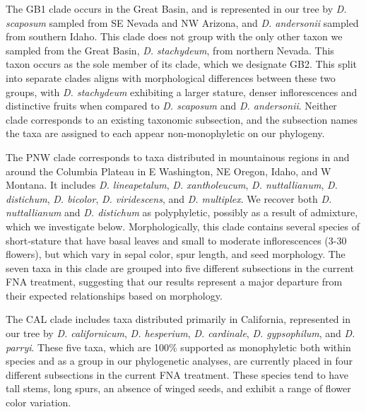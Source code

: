 \documentclass[11pt]{article}
\begin{document}
The GB1 clade occurs in the Great Basin, and is represented in our tree
by \emph{D. scaposum} sampled from SE Nevada and NW Arizona, and 
\emph{D. andersonii} sampled from southern Idaho.
This clade does not group with the only other taxon we sampled from the Great
Basin, \emph{D. stachydeum}, from northern Nevada. This taxon occurs as the
sole member of its clade, which we designate GB2. 
% 
This split into separate clades aligns with morphological differences between these
two groups, with \textit{D. stachydeum} exhibiting a larger stature, denser 
inflorescences and distinctive fruits when compared to \textit{D. scaposum} and 
\textit{D. andersonii}. 
% 
Neither clade corresponds to an existing taxonomic subsection, and the 
subsection names the taxa are assigned to each appear non-monophyletic on 
our phylogeny.

% 
The PNW clade corresponds to taxa distributed in mountainous regions in and around the Columbia
Plateau in E Washington, NE Oregon, Idaho, and W Montana. It includes \emph{D. lineapetalum}, 
\emph{D. xantholeucum}, \emph{D. nuttallianum}, \emph{D. distichum}, \emph{D. bicolor}, 
\emph{D. viridescens}, and \emph{D. multiplex}. We recover both \emph{D. nuttallianum}
and \emph{D. distichum} as polyphyletic, possibly as a result of admixture, which we
investigate below. 
Morphologically, this clade contains several species of short‑stature that have basal
leaves and small to moderate inflorescences (3-30 flowers), but which vary in sepal
color, spur length, and seed morphology.
% 
The seven taxa in this clade are grouped into five different subsections in the 
current FNA treatment, suggesting that our results represent a major departure from
their expected relationships based on morphology.

% 
The CAL clade includes taxa distributed primarily in California, represented in our
tree by \emph{D. californicum}, \emph{D. hesperium}, \emph{D. cardinale}, 
\emph{D. gypsophilum}, and \emph{D. parryi}. 
These five taxa, which are 100\% supported as monophyletic both within species 
and as a group in our phylogenetic analyses, are currently placed in four different 
subsections in the current FNA treatment. These species tend to have tall stems, 
long spurs, an absence of winged seeds, and exhibit a range of flower color
variation.
\end{document}
